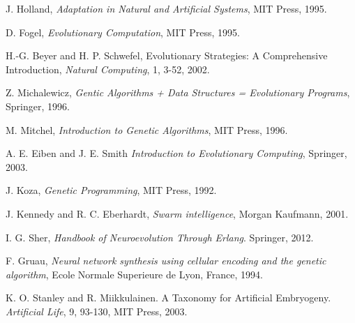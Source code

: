 \documentclass[12pt,fleqn,a4paper,proc]{article}
\begin{document}
\begin{thebibliography}{99}

J. Holland, \emph{Adaptation in Natural and Artificial Systems}, MIT Press, 1995.

D. Fogel, \emph{Evolutionary Computation}, MIT Press, 1995.

H.-G. Beyer and H. P. Schwefel, Evolutionary Strategies: A Comprehensive Introduction, \emph{Natural Computing}, 1, 3-52, 2002.

Z. Michalewicz, \emph{Gentic Algorithms + Data Structures = Evolutionary Programs}, Springer, 1996.

M. Mitchel, \emph{Introduction to Genetic Algorithms}, MIT Press, 1996.

A. E. Eiben and J. E. Smith \emph{Introduction to Evolutionary Computing}, Springer, 2003.

J. Koza, \emph{Genetic Programming}, MIT Press, 1992.

J. Kennedy and R. C. Eberhardt, \emph{Swarm intelligence}, Morgan Kaufmann, 2001.

I. G. Sher, \emph{Handbook of Neuroevolution Through Erlang}. Springer, 2012.

F. Gruau, \emph{Neural network synthesis using cellular encoding and the genetic algorithm}, Ecole Normale Superieure de Lyon, France, 1994.

K. O. Stanley and R. Miikkulainen. A Taxonomy for Artificial Embryogeny. \emph{Artificial Life}, 9, 93-130, MIT Press, 2003. 
\end{thebibliography}
\end{document}
